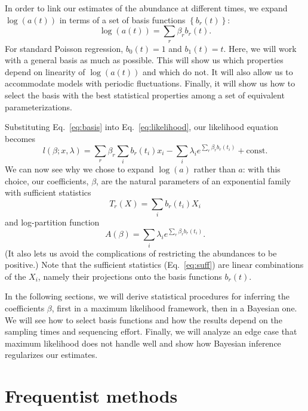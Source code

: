 \documentclass[12pt, letterpaper]{article}
\begin{document}
In order to link our estimates of the abundance at different times, we expand $\log(a(t))$ in terms of a set of basis functions $\left\{b_r(t)\right\}$:
\begin{equation}
    \log(a(t)) = \sum_r \beta_r b_r(t).
    \label{eq:basis}
\end{equation}
For standard Poisson regression, $b_0(t) = 1$ and $b_1(t) = t$.
Here, we will work with a general basis as much as possible.
This will show us which properties depend on linearity of $\log(a(t))$ and which do not.
It will also allow us to accommodate models with periodic fluctuations.
Finally, it will show us how to select the basis with the best statistical properties among a set of equivalent parameterizations.

Substituting Eq.~\ref{eq:basis} into Eq.~\ref{eq:likelihood}, our likelihood equation becomes
\begin{equation}
    l(\beta; x, \lambda) = \sum_r \beta_r \sum_i b_r(t_i) x_i - \sum_i \lambda_i e^{\sum_r \beta_r b_r(t_i)} + \text{const.}
\end{equation}
We can now see why we chose to expand $\log(a)$ rather than $a$:
with this choice, our coefficients, $\beta$, are the natural parameters of an exponential family with sufficient statistics
\begin{equation}
    T_r(X) = \sum_i b_r(t_i) X_i
    \label{eq:suff}
\end{equation}
and log-partition function
\begin{equation}
    A(\beta) = \sum_i \lambda_i e^{\sum_r \beta_r b_r(t_i)}.
\end{equation}
(It also lets us avoid the complications of restricting the abundances to be positive.)
Note that the sufficient statistics (Eq.~\ref{eq:suff}) are linear combinations of the $X_i$, namely their projections onto the basis functions $b_r(t)$.

In the following sections, we will derive statistical procedures for inferring the coefficients $\beta$, first in a maximum likelihood framework, then in a Bayesian one.
We will see how to select basis functions and how the results depend on the sampling times and sequencing effort.
Finally, we will analyze an edge case that maximum likelihood does not handle well and show how Bayesian inference regularizes our estimates.

\section{Frequentist methods}
\end{document}
